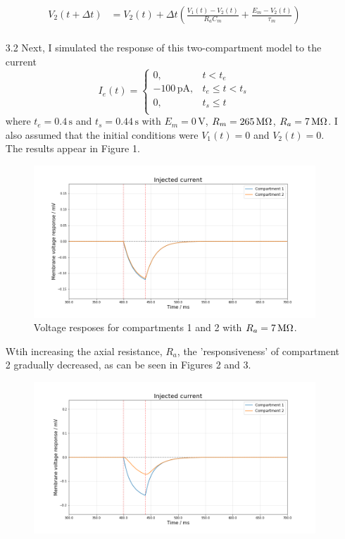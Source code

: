 \documentclass[12pt]{article}
\begin{document}
\begin{enumerate}
\begin{align*}
    V_{2}(t+\Delta t) &=  V_{2}(t) + \Delta t\left(\frac{V_{1}(t) - V_{2}(t)}{R_{a}C_{m}} + \frac{E_{m} - V_{2}(t)}{\tau_{m}}\right)\\
\end{align*}
\item[3.2] Next, I simulated the response of this two-compartment model to the current 
\[
    I_{e}(t)= 
\begin{cases}
    0, & t < t_{e}\\
    -100 \, \text{pA} ,              & t_{e} \leqslant t < t_{s}\\
    0, & t_{s} \leqslant t\\
\end{cases}
\]
where $t_{e} = 0.4 \, \text{s}$ and $t_{s} = 0.44 \, \text{s}$ with $E_{m} = 0 \, \text{V}$, $R_{m} = 265 \, \text{M\si{\ohm}}$, $R_{a} = 7 \, \text{M\si{\ohm}}$. I also 
assumed that the initial conditions were $V_{1}(t) = 0$ and $V_{2}(t) = 0$. 
The results appear in Figure 1.
\begin{figure}[h]
    \centering
    \includegraphics[width=\textwidth]{Ra_7M.png}
    \caption{Voltage resposes for compartments 1 and 2 with $R_{a} = 7 \, \text{M\si{\ohm}}$.}
\end{figure}
Wtih increasing the axial resistance, $R_{a}$, the 'responsiveness' of compartment 2 gradually decreased, as
can be seen in Figures 2 and 3.
\begin{figure}[h]
    \centering
    \includegraphics[width=\textwidth]{Ra_265M.png}

\end{figure}
\end{enumerate}
\end{document}
